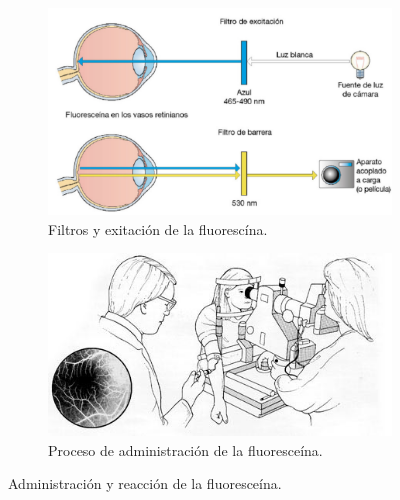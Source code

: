 \begin{figure}[H]
  \centering
	\begin{subfigure}[b]{0.45\textwidth}
        \includegraphics[width=1\textwidth]{./Figures/filtrosluz.pdf}
        \caption{Filtros y exitaci\'on de la fluoresc\'ina.}
        \label{fig:lightfilter}
    \end{subfigure}
	\begin{subfigure}[b]{0.45\textwidth}
        \includegraphics[width=1\textwidth]{./Figures/fluores.jpg}
        \caption{Proceso de administraci\'on de la fluoresce\'ina.}
        \label{fig:af2}
    \end{subfigure}
    
    \caption{Administraci\'on y reacci\'on de la fluoresce\'ina.}
\end{figure}





